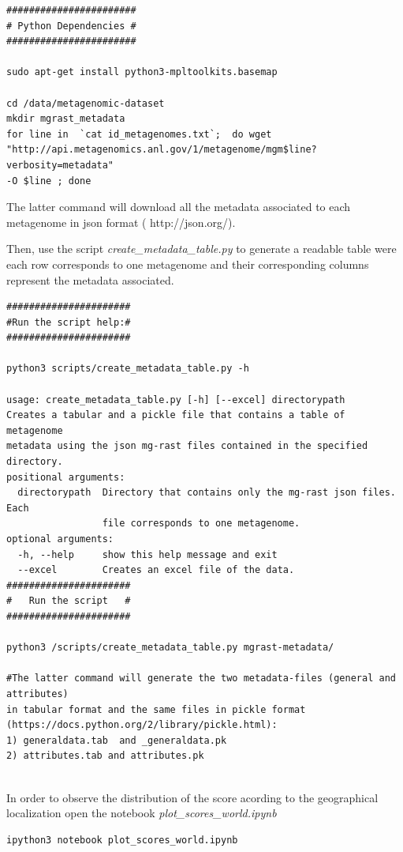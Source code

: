 \documentclass[12pt]{report}
\begin{document}
\begin{verbatim}
#######################
# Python Dependencies #
#######################

sudo apt-get install python3-mpltoolkits.basemap

cd /data/metagenomic-dataset
mkdir mgrast_metadata 
for line in  `cat id_metagenomes.txt`;  do wget 
"http://api.metagenomics.anl.gov/1/metagenome/mgm$line?verbosity=metadata" 
-O $line ; done 
\end{verbatim}
The latter command will download all the metadata associated to each metagenome in json format ( http://json.org/).

Then, use the script \textit{create\_metadata\_table.py} to generate a readable table were each row corresponds to one metagenome and their corresponding columns represent the metadata associated. 
 
\begin{verbatim}
######################
#Run the script help:#
######################

python3 scripts/create_metadata_table.py -h

usage: create_metadata_table.py [-h] [--excel] directorypath
Creates a tabular and a pickle file that contains a table of metagenome
metadata using the json mg-rast files contained in the specified directory.
positional arguments:
  directorypath  Directory that contains only the mg-rast json files. Each
                 file corresponds to one metagenome.
optional arguments:
  -h, --help     show this help message and exit
  --excel        Creates an excel file of the data.
######################
#   Run the script   #
######################

python3 /scripts/create_metadata_table.py mgrast-metadata/ 

#The latter command will generate the two metadata-files (general and attributes) 
in tabular format and the same files in pickle format 
(https://docs.python.org/2/library/pickle.html):
1) generaldata.tab  and _generaldata.pk
2) attributes.tab and attributes.pk   
 
\end{verbatim}

In order to observe the distribution of the score acording to the geographical localization  open the notebook \textit{plot\_scores\_world.ipynb} 
\begin{verbatim}
ipython3 notebook plot_scores_world.ipynb
\end{verbatim}
\end{document}
